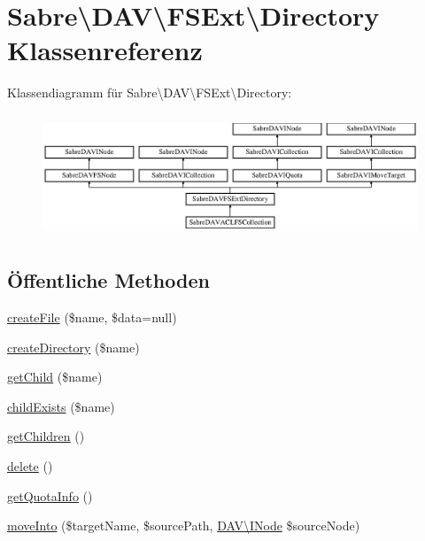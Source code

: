 \hypertarget{class_sabre_1_1_d_a_v_1_1_f_s_ext_1_1_directory}{}\section{Sabre\textbackslash{}D\+AV\textbackslash{}F\+S\+Ext\textbackslash{}Directory Klassenreferenz}
\label{class_sabre_1_1_d_a_v_1_1_f_s_ext_1_1_directory}
Klassendiagramm für Sabre\textbackslash{}D\+AV\textbackslash{}F\+S\+Ext\textbackslash{}Directory\+:\begin{figure}[H]
\begin{center}
\leavevmode
\includegraphics[height=3.684211cm]{class_sabre_1_1_d_a_v_1_1_f_s_ext_1_1_directory}
\end{center}
\end{figure}
\subsection*{Öffentliche Methoden}
\begin{DoxyCompactItemize}
\item 
\mbox{\hyperlink{class_sabre_1_1_d_a_v_1_1_f_s_ext_1_1_directory_af0c5ff461938c2cc3ab1b474166a5d57}{create\+File}} (\$name, \$data=null)
\item 
\mbox{\hyperlink{class_sabre_1_1_d_a_v_1_1_f_s_ext_1_1_directory_a14dbd580c21095860343679d4a407b41}{create\+Directory}} (\$name)
\item 
\mbox{\hyperlink{class_sabre_1_1_d_a_v_1_1_f_s_ext_1_1_directory_a48a768e92b00f3d33f567830a7be8932}{get\+Child}} (\$name)
\item 
\mbox{\hyperlink{class_sabre_1_1_d_a_v_1_1_f_s_ext_1_1_directory_a7fd5c47b0712920ba3d565f9c878ff46}{child\+Exists}} (\$name)
\item 
\mbox{\hyperlink{class_sabre_1_1_d_a_v_1_1_f_s_ext_1_1_directory_a1e4053591ca60a6abd189f88b6ed1bba}{get\+Children}} ()
\item 
\mbox{\hyperlink{class_sabre_1_1_d_a_v_1_1_f_s_ext_1_1_directory_a4eccd150f17f166b79aa20d6e44a234f}{delete}} ()
\item 
\mbox{\hyperlink{class_sabre_1_1_d_a_v_1_1_f_s_ext_1_1_directory_ade982b162db5a0310179c05a2d47a507}{get\+Quota\+Info}} ()
\item 
\mbox{\hyperlink{class_sabre_1_1_d_a_v_1_1_f_s_ext_1_1_directory_a0b0f044e2346a01a1b01f90d1bb20ae7}{move\+Into}} (\$target\+Name, \$source\+Path, \mbox{\hyperlink{interface_sabre_1_1_d_a_v_1_1_i_node}{D\+A\+V\textbackslash{}\+I\+Node}} \$source\+Node)
\end{DoxyCompactItemize}
